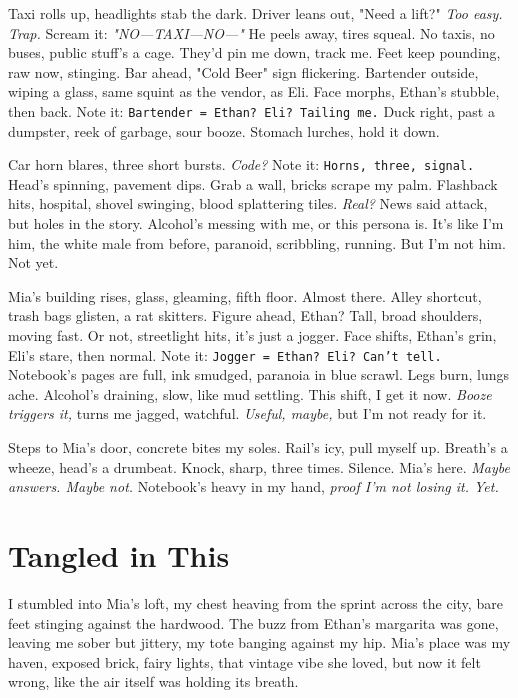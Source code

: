 \documentclass[12pt,oneside]{book} %
\newcommand{\note}[1]{\texttt{#1}}
\begin{document}
Taxi rolls up, headlights stab the dark. Driver leans out, "Need a lift?" \textit{Too easy. Trap.} Scream it: \textit{"NO—TAXI—NO—"} He peels away, tires squeal. No taxis, no buses, public stuff’s a cage. They’d pin me down, track me. Feet keep pounding, raw now, stinging. Bar ahead, "Cold Beer" sign flickering. Bartender outside, wiping a glass, same squint as the vendor, as \textnormal{Eli}. Face morphs, Ethan’s stubble, then back. Note it: \note{Bartender = Ethan? Eli? Tailing me.} Duck right, past a dumpster, reek of garbage, sour booze. Stomach lurches, hold it down.

Car horn blares, three short bursts. \textit{Code?} Note it: \note{Horns, three, signal.} Head’s spinning, pavement dips. Grab a wall, bricks scrape my palm. Flashback hits, hospital, shovel swinging, blood splattering tiles. \textit{Real?} News said attack, but holes in the story. Alcohol’s messing with me, or this persona is. It’s like I’m him, the white male from before, paranoid, scribbling, running. But I’m not him. Not yet.

Mia’s building rises, glass, gleaming, fifth floor. Almost there. Alley shortcut, trash bags glisten, a rat skitters. Figure ahead, Ethan? Tall, broad shoulders, moving fast. Or not, streetlight hits, it’s just a jogger. Face shifts, Ethan’s grin, \textnormal{Eli}’s stare, then normal. Note it: \note{Jogger = Ethan? Eli? Can’t tell.} Notebook’s pages are full, ink smudged, paranoia in blue scrawl. Legs burn, lungs ache. Alcohol’s draining, slow, like mud settling. This shift, I get it now. \textit{Booze triggers it,} turns me jagged, watchful. \textit{Useful, maybe,} but I’m not ready for it.

Steps to Mia’s door, concrete bites my soles. Rail’s icy, pull myself up. Breath’s a wheeze, head’s a drumbeat. Knock, sharp, three times. Silence. Mia’s here. \textit{Maybe answers. Maybe not.} Notebook’s heavy in my hand, \textit{proof I’m not losing it. Yet.}

\chapter{Tangled in This}

I stumbled into Mia’s loft, my chest heaving from the sprint across the city, bare feet stinging against the hardwood. The buzz from Ethan’s margarita was gone, leaving me sober but jittery, my tote banging against my hip. Mia’s place was my haven, exposed brick, fairy lights, that vintage vibe she loved, but now it felt wrong, like the air itself was holding its breath.
\end{document}
